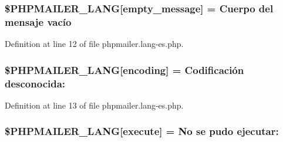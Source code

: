 \subsubsection[{\texorpdfstring{\$\+P\+H\+P\+M\+A\+I\+L\+E\+R\+\_\+\+L\+A\+NG}{$PHPMAILER_LANG}}]{\setlength{\rightskip}{0pt plus 5cm}\$P\+H\+P\+M\+A\+I\+L\+E\+R\+\_\+\+L\+A\+NG\mbox{[}\textquotesingle{}empty\+\_\+message\textquotesingle{}\mbox{]} = \textquotesingle{}Cuerpo del mensaje vacío\textquotesingle{}}\hypertarget{phpmailer_8lang-es_8php_a33772099f637c9d6c2cd7425e0e37fed}{}\label{phpmailer_8lang-es_8php_a33772099f637c9d6c2cd7425e0e37fed}


Definition at line 12 of file phpmailer.\+lang-\/es.\+php.

\subsubsection[{\texorpdfstring{\$\+P\+H\+P\+M\+A\+I\+L\+E\+R\+\_\+\+L\+A\+NG}{$PHPMAILER_LANG}}]{\setlength{\rightskip}{0pt plus 5cm}\$P\+H\+P\+M\+A\+I\+L\+E\+R\+\_\+\+L\+A\+NG\mbox{[}\textquotesingle{}encoding\textquotesingle{}\mbox{]} = \textquotesingle{}Codificación desconocida\+: \textquotesingle{}}\hypertarget{phpmailer_8lang-es_8php_a817f7283f3d54c970a0c10305cc668cc}{}\label{phpmailer_8lang-es_8php_a817f7283f3d54c970a0c10305cc668cc}


Definition at line 13 of file phpmailer.\+lang-\/es.\+php.

\subsubsection[{\texorpdfstring{\$\+P\+H\+P\+M\+A\+I\+L\+E\+R\+\_\+\+L\+A\+NG}{$PHPMAILER_LANG}}]{\setlength{\rightskip}{0pt plus 5cm}\$P\+H\+P\+M\+A\+I\+L\+E\+R\+\_\+\+L\+A\+NG\mbox{[}\textquotesingle{}execute\textquotesingle{}\mbox{]} = \textquotesingle{}No se pudo ejecutar\+: \textquotesingle{}}\hypertarget{phpmailer_8lang-es_8php_a668217a9563a168f30f2a8548b6ed5a9}{}\label{phpmailer_8lang-es_8php_a668217a9563a168f30f2a8548b6ed5a9}


